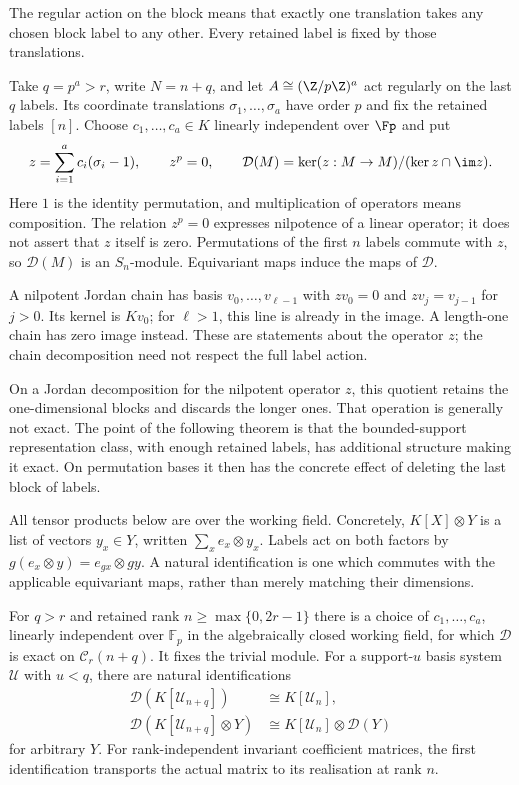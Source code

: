The regular action on the block means that exactly one translation
takes any chosen block label to any other. Every retained label is
fixed by those translations.

Take $q=p^a>r$, write $N=n+q$, and let $A\cong(\Z/p\Z)^a$ act regularly on the last $q$ labels. Its coordinate translations
$\sigma_1,\ldots,\sigma_a$ have order $p$ and fix the retained labels
$[n]$. Choose $c_1,\ldots,c_a\in K$ linearly independent over $\Fp$ and put
\[
 z=\sum_{i=1}^a c_i(\sigma_i-1),\qquad z^p=0,\qquad
 \mathcal D(M)=\ker(z:M\to M)/(\ker z\cap\im z).
\]
Here $1$ is the identity permutation, and multiplication of operators
means composition. The relation $z^p=0$ expresses nilpotence of a
linear operator; it does not assert that $z$ itself is zero.
Permutations of the first $n$ labels commute with $z$, so $\mathcal D(M)$ is an $S_n$-module. Equivariant maps induce the maps of $\mathcal D$.

A nilpotent Jordan chain has basis $v_0,\ldots,v_{\ell-1}$ with
$zv_0=0$ and $zv_j=v_{j-1}$ for $j>0$. Its kernel is $Kv_0$;
for $\ell>1$, this line is already in the image. A length-one chain
has zero image instead. These are statements about the operator $z$;
the chain decomposition need not respect the full label action.

On a Jordan decomposition for the nilpotent operator $z$, this quotient
retains the one-dimensional blocks and discards the longer ones. That
operation is generally not exact. The point of the following theorem is
that the bounded-support representation class, with enough retained labels,
has additional structure making it exact. On permutation bases it then
has the concrete effect of deleting the last block of labels.

All tensor products below are over the working field. Concretely,
$K[X]\otimes Y$ is a list of vectors $y_x\in Y$, written
$\sum_x e_x\otimes y_x$. Labels act on both factors by
$g(e_x\otimes y)=e_{gx}\otimes gy$. A natural identification is one
which commutes with the applicable equivariant maps, rather than merely
matching their dimensions.

\begin{theorem}\label{thm:deletion}
For $q>r$ and retained rank $n\ge\max\{0,2r-1\}$ there is a choice of $c_1,\ldots,c_a$, linearly independent over $\mathbb F_p$ in the algebraically closed working field, for which $\mathcal D$ is exact on $\mathcal C_r(n+q)$. It fixes the trivial module. For a support-$u$ basis system $\mathcal U$ with $u<q$, there are natural identifications
\begin{align}
 \mathcal D(K[\mathcal U_{n+q}])&\cong K[\mathcal U_n],\label{eq:permdelete}\\
 \mathcal D(K[\mathcal U_{n+q}]\otimes Y)&\cong
 K[\mathcal U_n]\otimes\mathcal D(Y)\label{eq:tensordelete}
\end{align}
for arbitrary $Y$. For rank-independent invariant coefficient matrices, the first identification transports the actual matrix to its realisation at rank $n$.
\end{theorem}

